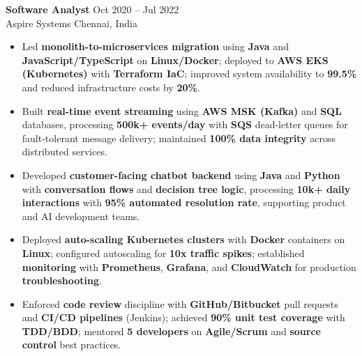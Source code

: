 \documentclass[letterpaper,10pt]{article}
\newcommand{\resumeItem}[1]{\item\small #1}
\newcommand{\resumeSubheading}[4]{
  \vspace{6pt}
  \noindent
  \textbf{#1} \hfill {\footnotesize #2} \\
  [-1pt]
  \noindent
  \small #3 \hfill {\small #4}
  \vspace{3pt}
}
\newcommand{\resumeItemsStart}{\vspace{-2pt}\begin{itemize}}
\newcommand{\resumeItemsEnd}{\end{itemize}\vspace{6pt}}
\begin{document}
\resumeSubheading
{Software Analyst}{Oct 2020 -- Jul 2022}
{Aspire Systems}{Chennai, India}
\resumeItemsStart
\resumeItem{Led \textbf{monolith-to-microservices migration} using \textbf{Java} and \textbf{JavaScript/TypeScript} on \textbf{Linux/Docker}; deployed to \textbf{AWS EKS (Kubernetes)} with \textbf{Terraform IaC}; improved system availability to \textbf{99.5\%} and reduced infrastructure costs by \textbf{20\%}.}
\resumeItem{Built \textbf{real-time event streaming} using \textbf{AWS MSK (Kafka)} and \textbf{SQL} databases, processing \textbf{500k+ events/day} with \textbf{SQS} dead-letter queues for fault-tolerant message delivery; maintained \textbf{100\% data integrity} across distributed services.}
\resumeItem{Developed \textbf{customer-facing chatbot backend} using \textbf{Java} and \textbf{Python} with \textbf{conversation flows} and \textbf{decision tree logic}, processing \textbf{10k+ daily interactions} with \textbf{95\% automated resolution rate}, supporting product and AI development teams.}
\resumeItem{Deployed \textbf{auto-scaling Kubernetes clusters} with \textbf{Docker} containers on \textbf{Linux}; configured autoscaling for \textbf{10x traffic spikes}; established \textbf{monitoring} with \textbf{Prometheus}, \textbf{Grafana}, and \textbf{CloudWatch} for production \textbf{troubleshooting}.}
\resumeItem{Enforced \textbf{code review} discipline with \textbf{GitHub/Bitbucket} pull requests and \textbf{CI/CD pipelines} (Jenkins); achieved \textbf{90\% unit test coverage} with \textbf{TDD/BDD}; mentored \textbf{5 developers} on \textbf{Agile/Scrum} and \textbf{source control} best practices.}
\resumeItemsEnd
\vspace{-8pt}


\end{document}
